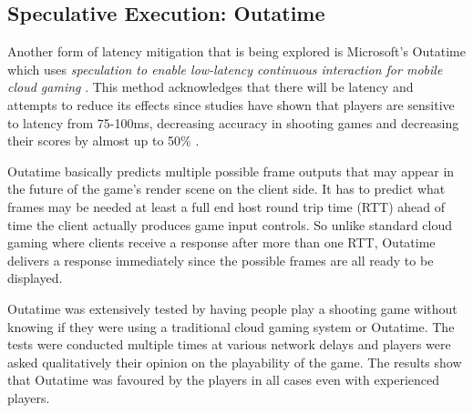 \subsection{Speculative Execution: Outatime}
Another form of latency mitigation that is being explored is Microsoft's Outatime which uses \textit{speculation to enable low-latency continuous interaction for mobile cloud gaming} \cite{lee2015outatime}. This method acknowledges that there will be latency and attempts to reduce its effects since studies have shown that players are sensitive to latency from 75-100ms, decreasing accuracy in shooting games and decreasing their scores by almost up to 50\% \cite{beigbeder2004effects}.
\newline 
\par
Outatime basically predicts multiple possible frame outputs that may appear in the future of the game's render scene on the client side. It has to predict what frames may be needed at least a full end host round trip time (RTT) ahead of time the client actually produces game input controls. So unlike standard cloud gaming where clients receive a response after more than one RTT, Outatime delivers a response immediately since the possible frames are all ready to be displayed.
\newline
\par
Outatime was extensively tested by having people play a shooting game without knowing if they were using a traditional cloud gaming system or Outatime. The tests were conducted multiple times at various network delays and players were asked qualitatively their opinion on the playability of the game. The results show that Outatime was favoured by the players in all cases even with experienced players.

